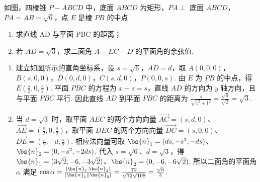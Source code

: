 \begin{problem}
如图，四棱锥 \(P - ABCD\) 中，底面 \(ABCD\) 为矩形，\(PA \perp\) 底面 \(ABCD\)，\(PA = AB = \sqrt{6}\)，点 \(E\) 是棱 \(PB\) 的中点.

\begin{enumerate}
\item 求直线 AD 与平面 PBC 的距离；
\item 若 \(AD = \sqrt{3}\)，求二面角 \(A - EC - D\) 的平面角的余弦值.
\end{enumerate}


\begin{solution}
\begin{enumerate}
\item 建立如图所示的直角坐标系，设 \(s=\sqrt{6}\)，\(AD=d\)，取 \(A(0,0,0)\)，\(B(s,0,0)\)，\(D(0,d,0)\)，\(C(s,d,0)\)，\(P(0,0,s)\). 由 \(E\) 为 \(PB\) 的中点，得 \(E\left(\frac{s}{2},0,\frac{s}{2}\right)\). 平面 \(PBC\) 的方程为 \(x+z=s\)，直线 \(AD\) 的方向为 \(y\) 轴方向，且与平面 \(PBC\) 平行. 因此直线 \(AD\) 到平面 \(PBC\) 的距离为 \(\frac{s}{\sqrt{1^2+1^2}}=\frac{\sqrt{6}}{\sqrt{2}}=\sqrt{3}\).
\item 当 \(d=\sqrt{3}\) 时，取平面 \(AEC\) 的两个方向向量 \(\overrightarrow{AC}=(s,d,0)\)、\(\overrightarrow{AE}=\left(\frac{s}{2},0,\frac{s}{2}\right)\)，取平面 \(DEC\) 的两个方向向量 \(\overrightarrow{DC}=(s,0,0)\)、\(\overrightarrow{DE}=\left(\frac{s}{2},-d,\frac{s}{2}\right)\). 相应法向量可取 \(\bs{n}_1=(ds,-s^2,-ds)\)、\(\bs{n}_2=(0,-s^2,-2ds)\). 代入 \(s=\sqrt{6}\)、\(d=\sqrt{3}\)，得 \(\bs{n}_1=(3\sqrt{2},-6,-3\sqrt{2})\)、\(\bs{n}_2=(0,-6,-6\sqrt{2})\). 所以二面角的平面角 \(\alpha\) 满足 \(\cos\alpha=\frac{|\bs{n}_1\cdot\bs{n}_2|}{|\bs{n}_1||\bs{n}_2|}=\frac{72}{\sqrt{72}\sqrt{108}}=\frac{\sqrt{6}}{3}\).
\end{enumerate}
\end{solution}
\end{problem}

